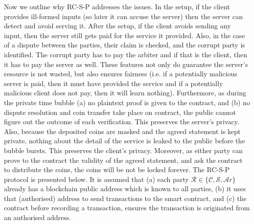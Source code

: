 Now we outline why RC-S-P addresses the issues.    In the setup, if the client provides ill-formed inputs (so later it can  accuse the server) then the server can detect and avoid serving it.  After the setup, if the client avoids sending any input,  then the server still gets paid for the service it provided. Also, in the case of a dispute between the parties, their claim is checked, and  the corrupt party is identified. The corrupt party has to pay the arbiter and if that is the client, then it has to pay the server as well.  These  features not only do guarantee the server's resource is not wasted, but also ensures fairness (i.e.  if a potentially malicious server is paid, then it must have provided the service and if a potentially malicious client does not pay, then it will learn nothing). Furthermore, as during the private time bubble  (a) no plaintext proof is given to the contract, and (b) no dispute resolution and coin transfer take place on contract, the public cannot figure out the outcome of each verification. This  preserves the server's privacy. Also, because the  deposited coins are masked and the agreed statement is kept private,   nothing about the detail of the service  is leaked to the public before the bubble bursts. This preserves the client's privacy. Moreover, as either party can prove to the contract the validity of the agreed statement, and ask the contract to distribute the coins, the coins will be not be locked forever. The RC-S-P protocol is presented below. It is assumed that (a) each party $\mathcal{R} \in\{\mathcal{C,S,A}r\}$ already has a blockchain public address which is known to all parties, (b) it uses that (authorised) address to send transactions to the smart contract, and (c) the contract   before recording a transaction, ensures the transaction is  originated from an authorised address.

